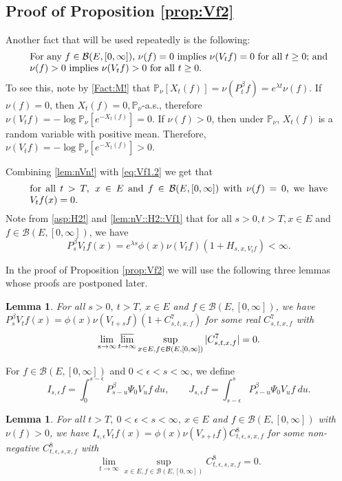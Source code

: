 \documentclass[12pt,a4paper]{amsart}
\numberwithin{equation}{section}
\theoremstyle{plain}
\newtheorem{lem}[thm]{Lemma}
\theoremstyle{definition}
\theoremstyle{remark}
\begin{document}
\subsection{Proof of Proposition \ref{prop:Vf2}} \label{sec:Vf2}
	Another fact that will be used repeatedly is the following:
\begin{equation}
\begin{minipage}{0.9\textwidth}
	For any $f\in \mathcal B(E,[0,\infty])$, $\nu(f) = 0$ implies $\nu(V_tf)=0$ for all $t\ge 0$; and $\nu(f)>0$ implies $\nu(V_tf)>0$ for all $t\ge 0$.
\end{minipage}\label{lem:nVn!}
\end{equation}
	To see this, note by \eqref{Fact:M!} that $ \mathbb P_\nu[X_t(f)] = \nu (P_t^\beta f) = e^{\lambda t}\nu (f). $
	If $\nu(f) = 0$, then $X_t(f)=0, \mathbb P_\nu$-a.s., therefore $\nu(V_t f) = - \log \mathbb P_\nu[e^{-X_t(f)}] =0. $
	If $\nu(f) > 0$, then under $\mathbb P_\nu$, $X_t(f)$ is a random variable with positive mean.
	Therefore, $ \nu(V_tf) = - \log \mathbb P_\nu[e^{-X_t(f)}] >0$.

	Combining \eqref{lem:nVn!} with \eqref{eq:Vf1.2} we get that
\begin{equation}
\begin{minipage}{0.9\textwidth}
	for all $t>T,~x\in E$ and $f \in \mathcal B(E,[0,\infty])$ with $\nu(f) = 0$, we have $V_t f(x ) = 0$.
\end{minipage} \label{lem:nullVf}
\end{equation}
Note  from \eqref{asp:H2!} and \eqref{lem:nV::H2::Vf1} that for all $s>0, t> T, x\in E$ and $f\in \mathcal B(E,[0,\infty])$, we have
\begin{equation}
	P_s^\beta V_tf(x)  =e^{\lambda s} \phi(x)\nu(V_tf) (1+H_{s,x,V_tf}) <\infty.
\label{lem:PV}
\end{equation}

	In the proof of Proposition \ref{prop:Vf2} we will use the following three lemmas whose proofs are postponed later.

\begin{lem} \label{prop:PVf}
 For all $s> 0,~t> T,~ x\in E$ and $f\in \mathcal B(E,[0,\infty])$, we have $P_s^\beta V_t f(x) = \phi(x) \nu(V_{t+s}f) (1+C^7_{s,t,x,f})$ for some real $C^7_{s,t,x,f}$ with
\[
	\lim_{s\to \infty} \varlimsup_{t\to \infty} \sup_{x\in E, f\in \mathcal B(E,[0,\infty])} |C^7_{s,t,x,f}|
		= 0.
\]
\end{lem}

For $f\in \mathcal B(E,[0,\infty])$ and $0 < \epsilon < s < \infty$, we define
\begin{equation}
	I_{s,\epsilon} f
 	= \int_0^{s - \epsilon} P_{s - u}^\beta \Psi_0 V_u f ~du, \qquad
 	J_{s,\epsilon} f
 	= \int_{s-\epsilon}^s P_{s-u}^\beta \Psi_0 V_u f ~du.
\end{equation}
\begin{lem} \label{prop:IVf}
		For all $t> T,~0<\epsilon<s< \infty,~x\in E$ and $f\in \mathcal B(E,[0,\infty])$ with $\nu(f)>0$, we have $I_{s,\epsilon}V_t f(x) = \phi(x) \nu(V_{s+t} f) C^8_{t,\epsilon, s, x,f}$ for some non-negative $C^8_{t,\epsilon, s, x,f}$ with
\[
	\lim_{t\to \infty} \sup_{x\in E, f\in \mathcal B(E,[0,\infty])} C^8_{t,\epsilon, s, x,f} = 0.
\]
\end{lem}
\end{document}
